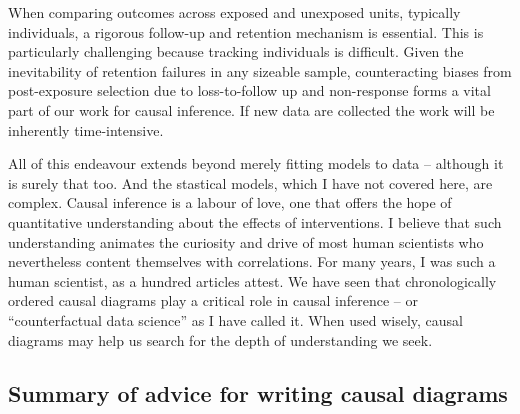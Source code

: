 \documentclass[
  singlecolumn]{report}
\begin{document}
When comparing outcomes across exposed and unexposed units, typically
individuals, a rigorous follow-up and retention mechanism is essential.
This is particularly challenging because tracking individuals is
difficult. Given the inevitability of retention failures in any sizeable
sample, counteracting biases from post-exposure selection due to
loss-to-follow up and non-response forms a vital part of our work for
causal inference. If new data are collected the work will be inherently
time-intensive.

All of this endeavour extends beyond merely fitting models to data --
although it is surely that too. And the stastical models, which I have
not covered here, are complex. Causal inference is a labour of love, one
that offers the hope of quantitative understanding about the effects of
interventions. I believe that such understanding animates the curiosity
and drive of most human scientists who nevertheless content themselves
with correlations. For many years, I was such a human scientist, as a
hundred articles attest. We have seen that chronologically ordered
causal diagrams play a critical role in causal inference -- or
``counterfactual data science'' as I have called it. When used wisely,
causal diagrams may help us search for the depth of understanding we
seek.

\hypertarget{summary-of-advice-for-writing-causal-diagrams}{%
\subsection{Summary of advice for writing causal
diagrams}\label{summary-of-advice-for-writing-causal-diagrams}}
\end{document}
